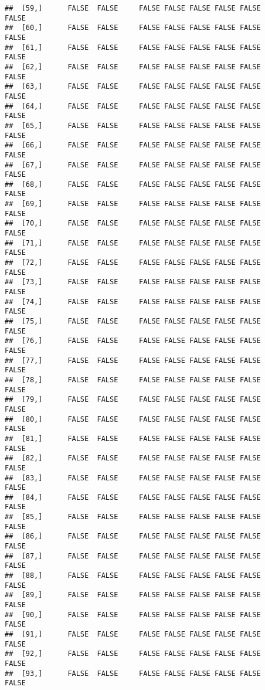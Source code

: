 \documentclass[
]{article}
\begin{document}
\begin{verbatim}
##  [59,]      FALSE  FALSE     FALSE FALSE FALSE FALSE FALSE         FALSE
##  [60,]      FALSE  FALSE     FALSE FALSE FALSE FALSE FALSE         FALSE
##  [61,]      FALSE  FALSE     FALSE FALSE FALSE FALSE FALSE         FALSE
##  [62,]      FALSE  FALSE     FALSE FALSE FALSE FALSE FALSE         FALSE
##  [63,]      FALSE  FALSE     FALSE FALSE FALSE FALSE FALSE         FALSE
##  [64,]      FALSE  FALSE     FALSE FALSE FALSE FALSE FALSE         FALSE
##  [65,]      FALSE  FALSE     FALSE FALSE FALSE FALSE FALSE         FALSE
##  [66,]      FALSE  FALSE     FALSE FALSE FALSE FALSE FALSE         FALSE
##  [67,]      FALSE  FALSE     FALSE FALSE FALSE FALSE FALSE         FALSE
##  [68,]      FALSE  FALSE     FALSE FALSE FALSE FALSE FALSE         FALSE
##  [69,]      FALSE  FALSE     FALSE FALSE FALSE FALSE FALSE         FALSE
##  [70,]      FALSE  FALSE     FALSE FALSE FALSE FALSE FALSE         FALSE
##  [71,]      FALSE  FALSE     FALSE FALSE FALSE FALSE FALSE         FALSE
##  [72,]      FALSE  FALSE     FALSE FALSE FALSE FALSE FALSE         FALSE
##  [73,]      FALSE  FALSE     FALSE FALSE FALSE FALSE FALSE         FALSE
##  [74,]      FALSE  FALSE     FALSE FALSE FALSE FALSE FALSE         FALSE
##  [75,]      FALSE  FALSE     FALSE FALSE FALSE FALSE FALSE         FALSE
##  [76,]      FALSE  FALSE     FALSE FALSE FALSE FALSE FALSE         FALSE
##  [77,]      FALSE  FALSE     FALSE FALSE FALSE FALSE FALSE         FALSE
##  [78,]      FALSE  FALSE     FALSE FALSE FALSE FALSE FALSE         FALSE
##  [79,]      FALSE  FALSE     FALSE FALSE FALSE FALSE FALSE         FALSE
##  [80,]      FALSE  FALSE     FALSE FALSE FALSE FALSE FALSE         FALSE
##  [81,]      FALSE  FALSE     FALSE FALSE FALSE FALSE FALSE         FALSE
##  [82,]      FALSE  FALSE     FALSE FALSE FALSE FALSE FALSE         FALSE
##  [83,]      FALSE  FALSE     FALSE FALSE FALSE FALSE FALSE         FALSE
##  [84,]      FALSE  FALSE     FALSE FALSE FALSE FALSE FALSE         FALSE
##  [85,]      FALSE  FALSE     FALSE FALSE FALSE FALSE FALSE         FALSE
##  [86,]      FALSE  FALSE     FALSE FALSE FALSE FALSE FALSE         FALSE
##  [87,]      FALSE  FALSE     FALSE FALSE FALSE FALSE FALSE         FALSE
##  [88,]      FALSE  FALSE     FALSE FALSE FALSE FALSE FALSE         FALSE
##  [89,]      FALSE  FALSE     FALSE FALSE FALSE FALSE FALSE         FALSE
##  [90,]      FALSE  FALSE     FALSE FALSE FALSE FALSE FALSE         FALSE
##  [91,]      FALSE  FALSE     FALSE FALSE FALSE FALSE FALSE         FALSE
##  [92,]      FALSE  FALSE     FALSE FALSE FALSE FALSE FALSE         FALSE
##  [93,]      FALSE  FALSE     FALSE FALSE FALSE FALSE FALSE         FALSE

\end{verbatim}
\end{document}
